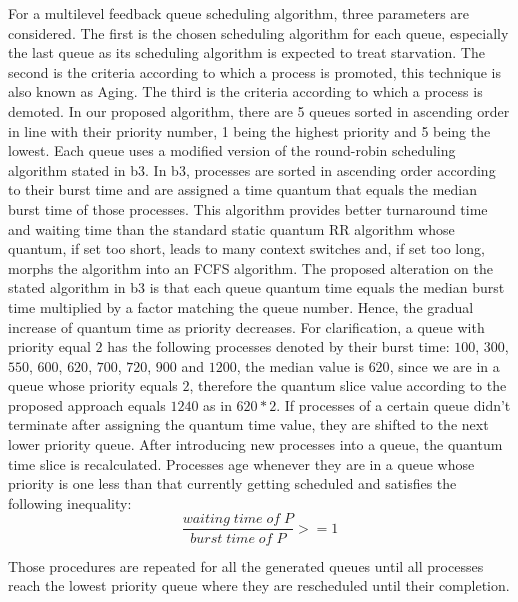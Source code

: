 \documentclass[conference]{IEEEtran}
\begin{document}
For a multilevel feedback queue scheduling algorithm, three parameters are considered. The first is the chosen scheduling algorithm for each queue, especially the last queue as its scheduling algorithm is expected to treat starvation. The second is the criteria according to which a process is promoted, this technique is also known as Aging. The third is the criteria according to which a process is demoted. In our proposed algorithm, there are 5 queues sorted in ascending order in line with their priority number, 1 being the highest priority and 5 being the lowest. Each queue uses a modified version of the round-robin scheduling algorithm stated in {b3}. In {b3}, processes are sorted in ascending order according to their burst time and are assigned a time quantum that equals the median burst time of those processes. This algorithm provides better turnaround time and waiting time than the standard static quantum RR algorithm whose quantum, if set too short, leads to many context switches and, if set too long, morphs the algorithm into an FCFS algorithm. The proposed alteration on the stated algorithm in {b3} is that each queue quantum time equals the median burst time multiplied by a factor matching the queue number. Hence, the gradual increase of quantum time as priority decreases. For clarification, a queue with priority equal $2$ has the following processes denoted by their burst time: $100$, $300$, $550$, $600$, $620$, $700$, $720$, $900$ and $1200$, the median value is $620$, since we are in a queue whose priority equals $2$, therefore the quantum slice value according to the proposed approach equals $1240$ as in $620 * 2$. If processes of a certain queue didn't terminate after assigning the quantum time value, they are shifted to the next lower priority queue. After introducing new processes into a queue, the quantum time slice is recalculated. Processes age whenever they are in a queue whose priority is one less than that currently getting scheduled and satisfies the following inequality:
\begin{equation}
\frac{waiting \; time \; of \; P}{burst \; time \; of \; P} >= 1\label{eq1}
\end{equation}

Those procedures are repeated for all the generated queues until all processes reach the lowest priority queue where they are rescheduled until their completion. 

\end{document}
